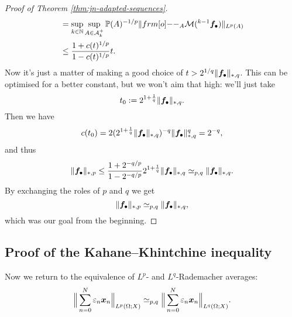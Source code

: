 \begin{proof}[Proof of Theorem \ref{thm:jn-adapted-sequences}]
\begin{equation*}
\begin{aligned}
      &= \sup_{k \in \N} \sup_{A \in \mc{A}_{k}^{+}} \P(A)^{-1/p} \|\1_{A} \mc{M}({}^{k-1}\mb{f}_{\bullet}) \|_{L^p(A)} \\
      &\leq \frac{1 + c(t)^{1/p}}{1 - c(t)^{1/p}} t .
    \end{aligned}
  \end{equation*}
  Now it's just a matter of making a good choice of $t > 2^{1/q} \|\bm{f}_{\bullet}\|_{*,q}$.
  This can be optimised for a better constant, but we won't aim that high: we'll just take
  \begin{equation*}
    t_{0} := 2^{1 + \frac{1}{q}} \|\bm{f}_{\bullet}\|_{*,q}.
  \end{equation*}
  Then we have
  \begin{equation*}
    c(t_0) = 2(2^{1 + \frac{1}{q}} \|\bm{f}_{\bullet}\|_{*,q})^{-q} \|\bm{f}_{\bullet}\|_{*,q}^{q} = 2^{-q},
  \end{equation*}
  and thus
  \begin{equation*}
    \|\bm{f}_{\bullet}\|_{*,p} \leq \frac{1 + 2^{-q/p}}{1 - 2^{-q/p}} 2^{1 + \frac{1}{q}} \|\bm{f}_{\bullet}\|_{*,q} \simeq_{p,q} \|\bm{f}_{\bullet}\|_{*,q}.
  \end{equation*}
  By exchanging the roles of $p$ and $q$ we get
  \begin{equation*}
    \|\bm{f}_{\bullet}\|_{*,p} \simeq_{p,q} \|\bm{f}_{\bullet}\|_{*,q},
  \end{equation*}
  which was our goal from the beginning.
  
\end{proof}

\subsection{Proof of the Kahane--Khintchine inequality}

Now we return to the equivalence of $L^p$- and $L^q$-Rademacher averages:
\begin{equation*}
  \Big\|\sum_{n=0}^{N} \varepsilon_{n} \bm{x}_{n} \Big\|_{L^p(\Omega;X)} \simeq_{p,q} \Big\|\sum_{n=0}^{N} \varepsilon_{n} \bm{x}_{n} \Big\|_{L^q(\Omega;X)}.
\end{equation*}

